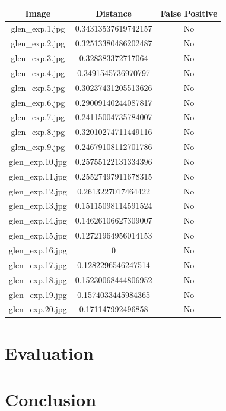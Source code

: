 \documentclass[12pt]{article}
\begin{document}
\begin{center}
\begin{tabular}{ccc}
Image & Distance & False Positive \\
\hline
glen\_exp.1.jpg & 0.34313537619742157 & No \\
glen\_exp.2.jpg & 0.32513380486202487 & No \\
glen\_exp.3.jpg & 0.328383372717064 & No \\
glen\_exp.4.jpg & 0.3491545736970797 & No \\
glen\_exp.5.jpg & 0.30237431205513626 & No \\
glen\_exp.6.jpg & 0.29009140244087817 & No \\
glen\_exp.7.jpg & 0.24115004735784007 & No \\
glen\_exp.8.jpg & 0.32010274711449116 & No \\
glen\_exp.9.jpg & 0.24679108112701786 & No \\
glen\_exp.10.jpg & 0.25755122131334396 & No \\
glen\_exp.11.jpg & 0.25527497911678315 & No \\
glen\_exp.12.jpg & 0.2613227017464422 & No \\
glen\_exp.13.jpg & 0.15115098114591524 & No \\
glen\_exp.14.jpg & 0.14626106627309007 & No \\
glen\_exp.15.jpg & 0.12721964956014153 & No \\
glen\_exp.16.jpg & 0 & No \\
glen\_exp.17.jpg & 0.1282296546247514 & No \\
glen\_exp.18.jpg & 0.15230068444806952 & No \\
glen\_exp.19.jpg & 0.1574033445984365 & No \\
glen\_exp.20.jpg & 0.171147992496858 & No \\
\end{tabular}
\end{center}

\newpage
\section{Evaluation}

\newpage
\section{Conclusion}

\newpage

\end{document}
